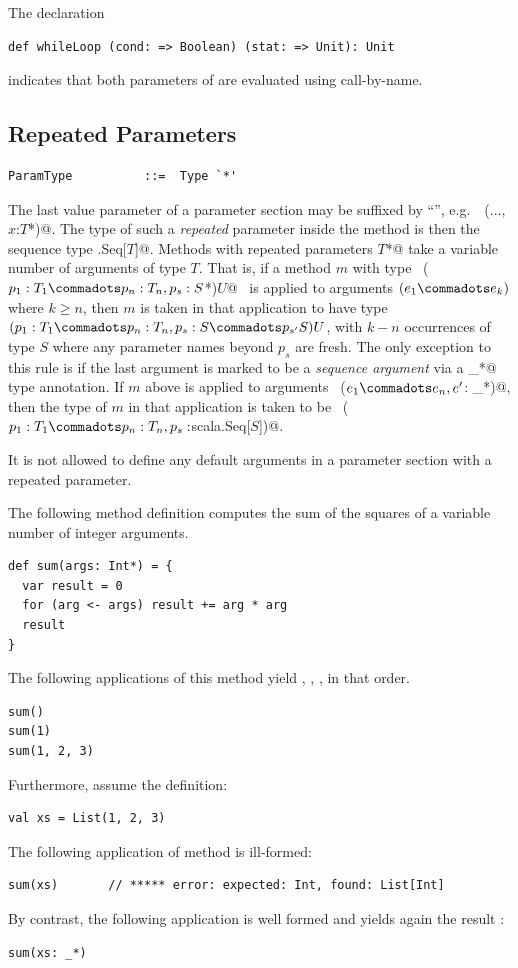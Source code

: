 \example The declaration
\begin{lstlisting}
def whileLoop (cond: => Boolean) (stat: => Unit): Unit
\end{lstlisting}
indicates that both parameters of  are evaluated using
call-by-name.

\subsection{Repeated Parameters}\label{sec:repeated-params}

\syntax\begin{lstlisting} 
ParamType          ::=  Type `*'
\end{lstlisting}

The last value parameter of a parameter section may be suffixed by
``\code{*}'', e.g.\ ~\lstinline@(..., $x$:$T$*)@.  The type of such a
{\em repeated} parameter inside the method is then the sequence type
\lstinline@scala.Seq[$T$]@.  Methods with repeated parameters
\lstinline@$T$*@ take a variable number of arguments of type $T$.
That is, if a method $m$ with type ~\lstinline@($p_1:T_1 \commadots p_n:T_n,
p_s:S$*)$U$@~ is applied to arguments $(e_1 \commadots e_k)$ where $k \geq
n$, then $m$ is taken in that application to have type $(p_1:T_1
\commadots p_n:T_n, p_s:S \commadots p_{s'}S)U$, with $k - n$ occurrences of type
$S$ where any parameter names beyond $p_s$ are fresh. The only exception to this rule is if the last argument is
marked to be a {\em sequence argument} via a \lstinline@_*@ type
annotation. If $m$ above is applied to arguments
~\lstinline@($e_1 \commadots e_n, e'$: _*)@, then the type of $m$ in
that application is taken to be 
~\lstinline@($p_1:T_1\commadots p_n:T_n,p_{s}:$scala.Seq[$S$])@.

It is not allowed to define any default arguments in a parameter section
with a repeated parameter.

\example The following method definition computes the sum of the squares of a variable number
of integer arguments.
\begin{lstlisting}
def sum(args: Int*) = {
  var result = 0
  for (arg <- args) result += arg * arg
  result
}
\end{lstlisting}
The following applications of this method yield , ,
, in that order.
\begin{lstlisting}
sum()
sum(1)
sum(1, 2, 3)
\end{lstlisting}
Furthermore, assume the definition:
\begin{lstlisting}
val xs = List(1, 2, 3)
\end{lstlisting}
The following application of method \lstinline@sum@ is ill-formed:
\begin{lstlisting}
sum(xs)       // ***** error: expected: Int, found: List[Int]
\end{lstlisting}
By contrast, the following application is well formed and yields again
the result :
\begin{lstlisting}
sum(xs: _*) 
\end{lstlisting}

